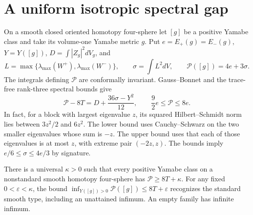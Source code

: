 \section{A uniform isotropic spectral gap}\label{sec:isotropic-gap}

On a smooth closed oriented homotopy four-sphere let \([g]\) be
a positive Yamabe class and take its volume-one Yamabe metric
\(g\). Put \(e=E_+(g)=E_-(g)\), \(Y=Y([g])\),
\(D=\int |Z_g|^2dV_g\), and
\[
 L=\max\{\lambda_{\max}(W^+),\lambda_{\max}(W^-)\},\qquad
 \sigma=\int L^2dV,\qquad \mathcal P([g])=4e+3\sigma .
\]
The integrals defining \(\mathcal P\) are conformally invariant.
Gauss--Bonnet and the trace-free rank-three spectral bounds give
\begin{equation}\label{eq:isotropic-quantity}
 \mathcal P-8T=D+\frac{36\sigma-Y^2}{12},\qquad
 \frac92e\le\mathcal P\le8e .
\end{equation}
In fact, for a block with largest eigenvalue \(z\), its squared
Hilbert--Schmidt norm lies between \(3z^2/2\) and \(6z^2\).
The lower bound uses Cauchy--Schwarz on the two smaller
eigenvalues whose sum is \(-z\). The upper bound uses that each
of those eigenvalues is at most \(z\), with extreme pair \((-2z,z)\).
The bounds imply \(e/6\le\sigma\le4e/3\) by signature.

\begin{theorem}\label{thm:isotropic-gap}
There is a universal \(\kappa>0\) such that every positive Yamabe
class on a nonstandard smooth homotopy four-sphere has
\(\mathcal P\ge8T+\kappa\). For any fixed \(0<\varepsilon<\kappa\),
the bound \(\inf_{Y([g])>0}\mathcal P([g])\le8T+\varepsilon\)
recognizes the standard smooth type, including an unattained
infimum. An empty family has infinite infimum.
\end{theorem}

